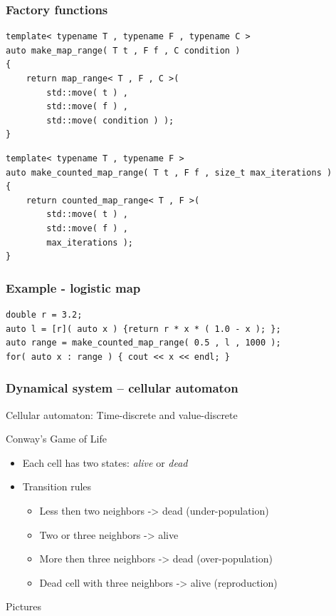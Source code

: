 \documentclass{beamer}
\newcommand{\heading}[1]{\frametitle{#1}}
\begin{document}
\begin{frame}[fragile]
 \heading{Factory functions}
 
\begin{lstlisting}[basicstyle=\scriptsize\ttfamily]
template< typename T , typename F , typename C >
auto make_map_range( T t , F f , C condition )
{
    return map_range< T , F , C >(
        std::move( t ) ,
        std::move( f ) ,
        std::move( condition ) );
}
\end{lstlisting}

\begin{lstlisting}[basicstyle=\scriptsize\ttfamily]
template< typename T , typename F >
auto make_counted_map_range( T t , F f , size_t max_iterations )
{
    return counted_map_range< T , F >(
        std::move( t ) ,
        std::move( f ) , 
        max_iterations );
}
\end{lstlisting}

\end{frame}


\begin{frame}[fragile]

  \heading{Example - logistic map}

\begin{lstlisting}[basicstyle=\scriptsize\ttfamily]
double r = 3.2;
auto l = [r]( auto x ) {return r * x * ( 1.0 - x ); };
auto range = make_counted_map_range( 0.5 , l , 1000 );
for( auto x : range ) { cout << x << endl; }
\end{lstlisting}
 
\end{frame}



\begin{frame}[fragile]
 \heading{Dynamical system -- cellular automaton}
 
 Cellular automaton: Time-discrete and value-discrete
 
 \vspace{2ex}
 Conway's Game of Life
 
 \begin{itemize}
  \item Each cell has two states: {\it alive} or {\it dead}
  \item Transition rules
  \begin{itemize}
    \item Less then two neighbors -> dead (under-population)
    \item Two or three neighbors -> alive 
    \item More then three neighbors -> dead (over-population)
    \item Dead cell with three neighbors -> alive (reproduction)
  \end{itemize}
 \end{itemize}
 
 Pictures

\end{frame}
\end{document}
